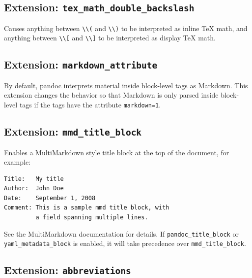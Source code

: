\documentclass[
  b5paper
]{book}
\begin{document}
\subsection{\texorpdfstring{Extension:
\texttt{tex\_math\_double\_backslash}}{Extension: tex\_math\_double\_backslash}}\label{extension-tex_math_double_backslash}

Causes anything between \texttt{\textbackslash{}\textbackslash{}(} and
\texttt{\textbackslash{}\textbackslash{})} to be interpreted as inline
TeX math, and anything between
\texttt{\textbackslash{}\textbackslash{}{[}} and
\texttt{\textbackslash{}\textbackslash{}{]}} to be interpreted as
display TeX math.

\subsection{\texorpdfstring{Extension:
\texttt{markdown\_attribute}}{Extension: markdown\_attribute}}\label{extension-markdown_attribute}

By default, pandoc interprets material inside block-level tags as
Markdown. This extension changes the behavior so that Markdown is only
parsed inside block-level tags if the tags have the attribute
\texttt{markdown=1}.

\subsection{\texorpdfstring{Extension:
\texttt{mmd\_title\_block}}{Extension: mmd\_title\_block}}\label{extension-mmd_title_block}

Enables a
\href{https://fletcherpenney.net/multimarkdown/}{MultiMarkdown} style
title block at the top of the document, for example:

\begin{verbatim}
Title:   My title
Author:  John Doe
Date:    September 1, 2008
Comment: This is a sample mmd title block, with
         a field spanning multiple lines.
\end{verbatim}

See the MultiMarkdown documentation for details. If
\texttt{pandoc\_title\_block} or \texttt{yaml\_metadata\_block} is
enabled, it will take precedence over \texttt{mmd\_title\_block}.

\subsection{\texorpdfstring{Extension:
\texttt{abbreviations}}{Extension: abbreviations}}\label{extension-abbreviations}
\end{document}
